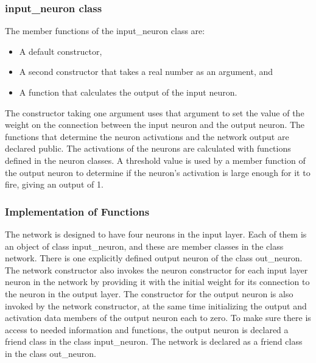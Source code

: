 \documentclass[12pt, right open]{memoir}
\begin{document}
\subsubsection{input\_neuron class}
The member functions of the input\_neuron class are: 
\begin{itemize}
\item A default constructor, 
\item A second constructor that takes a real number as an argument, and 
\item A function that calculates the output of the input neuron. \\
\end{itemize}


The constructor taking one argument uses that argument to set the value of the weight on the connection between the input neuron and the output neuron. The functions that determine the neuron activations and the network output are declared public. The activations of the neurons are calculated with functions defined in the neuron classes. A threshold value is used by a member function of the output neuron to determine if the neuron’s activation is
large enough for it to fire, giving an output of 1.

\subsubsection{Implementation of Functions}


The network is designed to have four neurons in the input layer. Each of them is an object of class input\_neuron, and these are member classes in the class network. There is one explicitly defined output neuron of the class out\_neuron. The network constructor also invokes the neuron constructor for each input layer neuron in the network by providing it with the initial weight for its connection to the neuron in the output layer. The constructor for the output neuron is also invoked by the network constructor, at the same time initializing the output and activation data members of the output neuron each to zero. To make sure there is access to needed information and functions, the output neuron is declared a friend class in the class input\_neuron. The network is declared as a friend class in the class out\_neuron.
\end{document}
